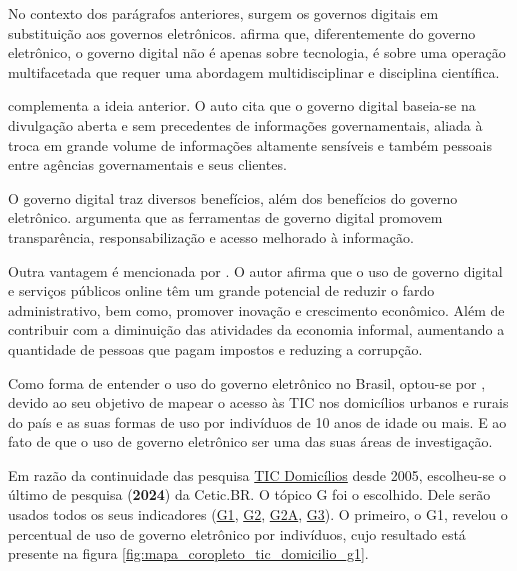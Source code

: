 No contexto dos parágrafos anteriores, surgem os governos digitais em substituição aos governos eletrônicos. \cite{veiga2016digital} afirma que, diferentemente do governo eletrônico, o governo digital não é apenas sobre tecnologia, é sobre uma operação multifacetada  que requer uma abordagem multidisciplinar e disciplina científica. 

\cite{bounabat2017government} complementa a ideia anterior. O auto cita que o governo digital baseia-se na divulgação aberta e sem precedentes de informações governamentais, aliada à troca em grande volume de informações altamente sensíveis e também pessoais entre agências governamentais e seus clientes. 

O governo digital traz diversos benefícios, além dos benefícios do governo eletrônico. \cite{martins2018war} argumenta que as ferramentas de governo digital promovem transparência, responsabilização e acesso melhorado à informação.

Outra vantagem é mencionada por \cite{veiga2016digital}. O autor afirma que o uso de governo digital e serviços públicos online têm um grande potencial de reduzir o fardo administrativo, bem como, promover inovação e crescimento econômico. Além de contribuir com a diminuição das atividades da economia informal, aumentando a quantidade de pessoas que pagam impostos e reduzing a corrupção.

Como forma de entender o uso do governo eletrônico no Brasil, optou-se por \cite{tic_domicilios_2024}, devido ao seu objetivo de mapear o acesso às TIC nos domicílios urbanos e rurais do país e as suas formas de uso por indivíduos de 10 anos de idade ou mais. E ao fato de que o uso de governo eletrônico ser uma das suas áreas de investigação.

Em razão da continuidade das pesquisa \href{https://cetic.br/pt/pesquisa/domicilios/}{TIC Domicílios} desde 2005, escolheu-se o último de pesquisa (\textbf{2024}) da Cetic.BR. O tópico G foi o escolhido. Dele serão usados todos os seus indicadores (\href{https://cetic.br/pt/tics/domicilios/2024/individuos/G1/}{G1}, \href{https://cetic.br/pt/tics/domicilios/2024/individuos/G2/}{G2}, \href{https://cetic.br/pt/tics/domicilios/2024/individuos/G2A/}{G2A}, \href{https://cetic.br/pt/tics/domicilios/2024/individuos/G3/}{G3}). O primeiro, o G1, revelou o percentual de uso de governo eletrônico por indivíduos, cujo resultado está presente na figura \ref{fig:mapa_coropleto_tic_domicilio_g1}.

